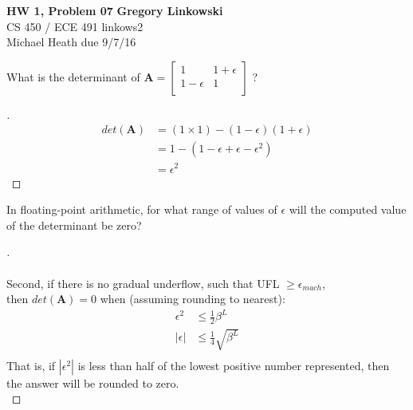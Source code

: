 \documentclass[12pt]{article}
\newenvironment{exercise}[2][Exercise]{\begin{trivlist}
\item[\hskip \labelsep {\bfseries #1}\hskip \labelsep {\bfseries #2.}]}{\end{trivlist}}
\begin{document}
\noindent
\large\textbf{HW 1, Problem 07} \hfill \textbf{Gregory Linkowski} \\
\normalsize CS 450 / ECE 491 \hfill linkows2 \\
Michael Heath \hfill due 9/7/16 \\



\begin{exercise}{1} 
	What is the determinant of $\bm{A} = 
	\begin{bmatrix}
		1 & 1 + \epsilon \\
		1 - \epsilon & 1\\
	\end{bmatrix} $ ?
\end{exercise}

\begin{proof}[]
	\begin{align*}
		det(\bm{A}) &= (1 \times 1) - (1-\epsilon)(1+\epsilon) \\
			&= 1 - (1 - \epsilon + \epsilon - \epsilon^2) \\
			&= \epsilon^2
	\end{align*}
\end{proof}


\begin{exercise}{2} 
	In floating-point arithmetic, for what range of values of $\epsilon$ will the computed value of the determinant be zero?
\end{exercise}

\begin{proof}[]
	 \\
	\vspace{2mm} \\
	Second, if there is no gradual underflow, such that UFL $\geq \epsilon_{mach}$, \\
	then $det(\bm{A}) = 0$ when (assuming rounding to nearest):
	\begin{align*}
		\epsilon^2 &\leq \frac{1}{2}\beta^L \\
		|\epsilon| &\leq \frac{1}{4}\sqrt{\beta^L} \\
	\end{align*}
	That is, if $|\epsilon^2|$ is less than half of the lowest positive number represented, then the answer will be rounded to zero. \\
\end{proof}
\end{document}
